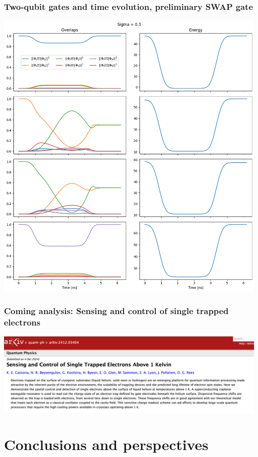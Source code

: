 \documentclass{beamer}
\begin{document}
\begin{frame}
\frametitle{Two-qubit gates and time evolution, preliminary SWAP gate}
\centerline{\includegraphics[width=0.66\linewidth]{qcfigures/timeevolution.png}}
\end{frame}

\begin{frame}
\frametitle{Coming analysis: Sensing and control of single trapped electrons}
\centerline{\includegraphics[width=1.2\linewidth]{qcfigures/sensing.png}}
\end{frame}







\section{Conclusions and perspectives}
\end{document}
